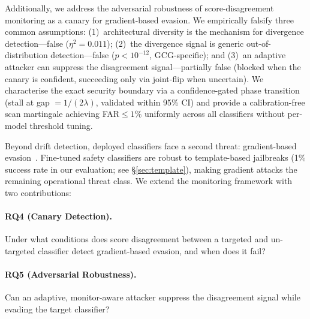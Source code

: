 

Additionally, we address the adversarial robustness of score-disagreement monitoring as a canary for gradient-based evasion. We empirically falsify three common assumptions: (1)~architectural diversity is the mechanism for divergence detection---false ($\eta^2 = 0.011$); (2)~the divergence signal is generic out-of-distribution detection---false ($p < 10^{-12}$, GCG-specific); and (3)~an adaptive attacker can suppress the disagreement signal---partially false (blocked when the canary is confident, succeeding only via joint-flip when uncertain). We characterise the exact security boundary via a confidence-gated phase transition (stall at gap $= 1/(2\lambda)$, validated within 95\% CI) and provide a calibration-free scan martingale achieving FAR${\leq}1\%$ uniformly across all classifiers without per-model threshold tuning.



Beyond drift detection, deployed classifiers face a second threat: gradient-based evasion~\citep{zou2023universal}. Fine-tuned safety classifiers are robust to template-based jailbreaks (1\% success rate in our evaluation; see \S\ref{sec:template}), making gradient attacks the remaining operational threat class. We extend the monitoring framework with two contributions:

\paragraph{RQ4 (Canary Detection).} Under what conditions does score disagreement between a targeted and un-targeted classifier detect gradient-based evasion, and when does it fail?

\paragraph{RQ5 (Adversarial Robustness).} Can an adaptive, monitor-aware attacker suppress the disagreement signal while evading the target classifier?


